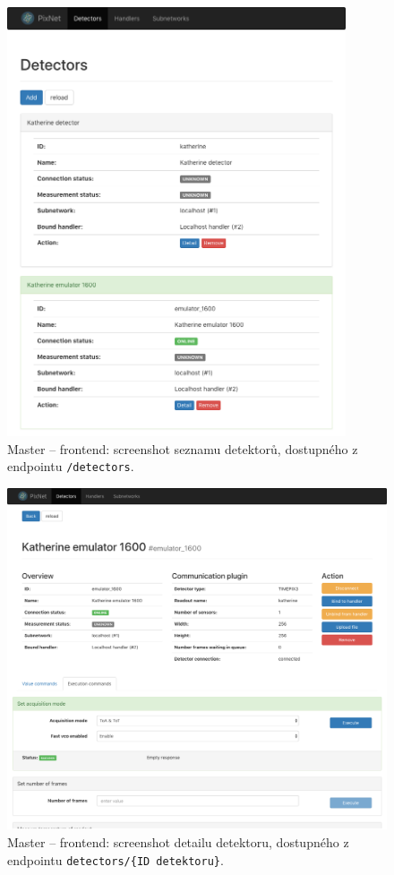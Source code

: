 \begin{figure}[h]
	\begin{center}
        \includegraphics[width=10cm]{figures/master_detectors.png}
	\end{center}
	\caption{Master -- frontend: screenshot seznamu detektorů, dostupného z endpointu \texttt{/detectors}.}
	\label{fig:master:frontend:detectors}
\end{figure}

\begin{figure}[h]
	\begin{center}
        \includegraphics[width=15cm]{figures/master_detector_detail.png}
	\end{center}
    \caption{Master -- frontend: screenshot detailu detektoru, dostupného z endpointu \texttt{detectors/\{ID detektoru\}}.}
	\label{fig:master:frontend:detector_detail}
\end{figure}


